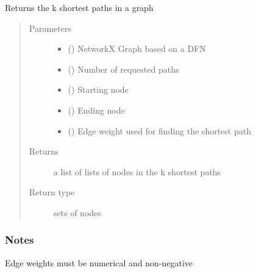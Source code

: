 \documentclass[letterpaper,10pt,english]{sphinxmanual}
\begin{document}
\begin{fulllineitems}
\label{\detokenize{pydfnworks:pydfnworks.dfnGraph.dfn2graph.k_shortest_paths}}
Returns the k shortest paths in a graph
\begin{quote}\begin{description}
\item[{Parameters}] \leavevmode\begin{itemize}
\item {} 
 () \textendash{} NetworkX Graph based on a DFN

\item {} 
 () \textendash{} Number of requested paths

\item {} 
 () \textendash{} Starting node

\item {} 
 () \textendash{} Ending node

\item {} 
 () \textendash{} Edge weight used for finding the shortest path

\end{itemize}

\item[{Returns}] \leavevmode
{} \textendash{} a list of lists of nodes in the k shortest paths

\item[{Return type}] \leavevmode
sets of nodes

\end{description}\end{quote}
\subsubsection*{Notes}

Edge weights must be numerical and non-negative

\end{fulllineitems}
\end{document}
